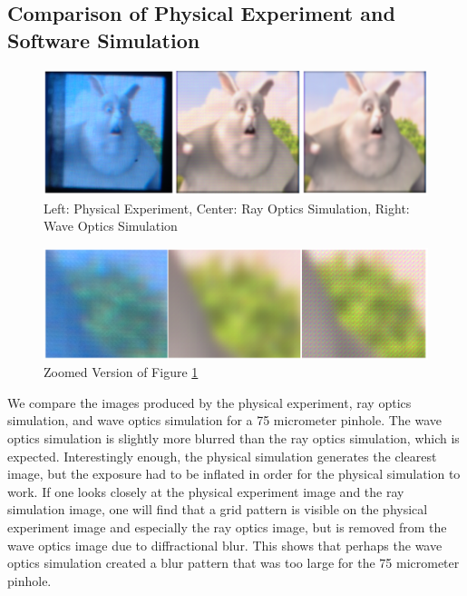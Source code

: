 \newpage
\subsection{Comparison of Physical Experiment and Software Simulation}

\begin{figure}[h!]
  \centering
  \includegraphics[width=6in]{chapters/chapter8/images/Comparison.png}
  \caption{Left: Physical Experiment, Center: Ray Optics Simulation, Right: Wave Optics Simulation}
  \label{fig:comparison}
\end{figure}

\begin{figure}[h!]
  \centering
  \includegraphics[width=6in]{chapters/chapter8/images/comparison_zoom.png}
  \caption{Zoomed Version of Figure \ref{fig:comparison}}
  \label{fig:comparison_zoom}
\end{figure}

We compare the images produced by the physical experiment, ray optics simulation, and wave optics simulation for a 75 micrometer pinhole. The wave optics simulation is slightly more blurred than the ray optics simulation, which is expected. Interestingly enough, the physical simulation generates the clearest image, but the exposure had to be inflated in order for the physical simulation to work. If one looks closely at the physical experiment image and the ray simulation image, one will find that a grid pattern is visible on the physical experiment image and especially the ray optics image, but is removed from the wave optics image due to diffractional blur. This shows that perhaps the wave optics simulation created a blur pattern that was too large for the 75 micrometer pinhole. 


